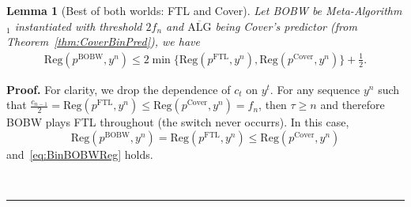 \documentclass[11pt,letter]{article}
\newtheorem{lemma}{Lemma}
\newenvironment{proof}[1][Proof]{\noindent\textbf{#1.} }{\ \rule{0.5em}{0.5em}}
\newcommand{\Reg}{\mathrm{Reg}}
\newcommand{\pcov}{p^{\mathrm{Cover}}}
\newcommand{\pftl}{p^{\mathrm{FTL}}}
\newcommand{\wcalg}{\overline{\text{ALG}}}
\newcommand{\pbobw}{p^{\mathrm{BOBW}}}
\begin{document}
\begin{lemma}[Best of both worlds: FTL and Cover] \label{lem:BOBWFTLandCov}
    Let BOBW be Meta-Algorithm$_1$ instantiated with threshold $2f_n$ and $\wcalg$ being Cover's predictor (from Theorem~\ref{thm:CoverBinPred}), we have 
    \begin{align}\label{eq:BinBOBWReg}
        \Reg(\pbobw, y^n) \le 2 \min\{\Reg(\pftl,y^n),\Reg(\pcov,y^n)\} + \frac{1}{2}.
    \end{align}
\end{lemma}
\begin{proof}
    For clarity, we drop the dependence of $c_t$ on $y^t$. For any sequence $y^n$ such that $\frac{c_{n-1}}{2} = \Reg(\pftl,y^n) \le \Reg(\pcov,y^n) = f_n$, then $\tau \ge n$ and therefore BOBW plays FTL throughout (the switch never occurrs). In this case, 
    \[
     \Reg(\pbobw, y^n) = \Reg(\pftl,y^n) \le \Reg(\pcov,y^n) 
    \]
    and~\eqref{eq:BinBOBWReg} holds.
    

\end{proof}
\end{document}
